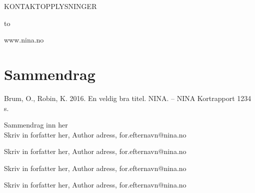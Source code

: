 \documentclass[11pt, a4paper]{article}
\newcommand{\smallspace}{\vspace{3mm}}
\begin{document}
\vfill
\footnotesize

\begin{minipage}{\linewidth}
KONTAKTOPPLYSNINGER \par\smallspace
\leavevmode\hbox to 
\par\vspace{3mm}
www.nina.no
\vspace{-4mm}
\end{minipage}

\clearpage
\setcounter{secnumdepth}{0}
\section{Sammendrag}


\footnotesize{Brum, O., Robin, K. 2016. En veldig bra titel. NINA.} – NINA Kortrapport 1234 \pageref{LastPage} s.\par
\vspace{0.5cm}
\normalsize{
Sammendrag inn her} \\

\vspace{1cm}
\small
Skriv in forfatter her, Author adress, for.efternavn@nina.no  \par
Skriv in forfatter her, Author adress, for.efternavn@nina.no  \par
Skriv in forfatter her, Author adress, for.efternavn@nina.no  \par
Skriv in forfatter her, Author adress, for.efternavn@nina.no  \par
\normalsize
\end{document}
